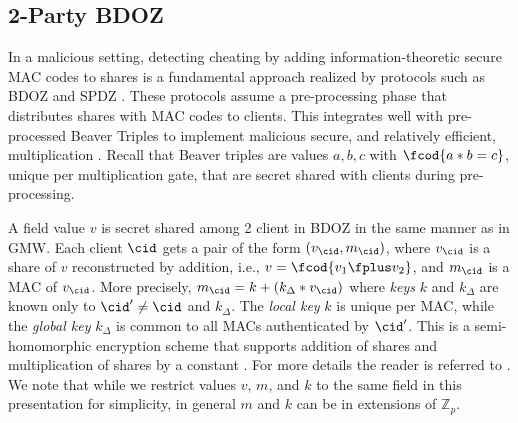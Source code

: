 \subsection{2-Party BDOZ}



In a malicious setting, detecting cheating by adding
information-theoretic secure MAC codes to shares is a fundamental
approach realized by protocols such as BDOZ \cite{XXX} and SPDZ
\cite{XXX}.  These protocols assume a pre-processing phase that
distributes shares with MAC codes to clients.  This integrates well
with pre-processed Beaver Triples to implement malicious secure, and
relatively efficient, multiplication \cite{XXX}. Recall
that Beaver triples are values $a,b,c$ with $\fcod{a * b = c}$,
unique per multiplication gate, that are secret shared with clients
during pre-processing. 

A field value $v$ is secret shared among 2 client in BDOZ in the same
manner as in GMW.  Each client $\cid$ gets a pair of the form
$(v_\cid,m_\cid)$, where $v_\cid$ is a share of $v$ reconstructed by
addition, i.e., $v = \fcod{v_1 \fplus v_2}$, and $m_\cid$ is a MAC of
$v_\cid$.  More precisely, $m_\cid = k + (k_\Delta * v_\cid)$ where
\emph{keys} $k$ and $k_\Delta$ are known only to $\cid' \ne \cid$ and
$k_\Delta$. The \emph{local key} $k$ is unique per MAC, while the
\emph{global key} $k_\Delta$ is common to all MACs authenticated by
$\cid'$. This is a semi-homomorphic encryption scheme that supports
addition of shares and multiplication of shares by a constant
\cite{XXX}. For more details the reader is referred to \cite{XXX}. We
note that while we restrict values $v$, $m$, and $k$ to the same field
in this presentation for simplicity, in general $m$ and $k$ can be in
extensions of $\mathbb{Z}_p$.

